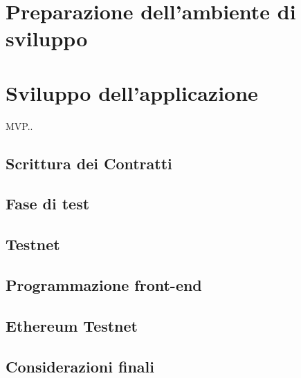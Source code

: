 \section{Preparazione dell'ambiente di sviluppo}

\section{Sviluppo dell'applicazione}
MVP..
\subsection{Scrittura dei Contratti}

\subsection{Fase di test}

\subsection{Testnet}

\subsection{Programmazione front-end}

\subsection{Ethereum Testnet}

\subsection{Considerazioni finali}


